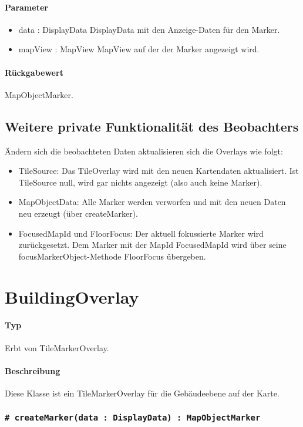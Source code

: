 \paragraph*{Parameter}
\begin{itemize}
    \item data : DisplayData DisplayData mit den Anzeige-Daten für den Marker.
    \item mapView : MapView MapView auf der der Marker angezeigt wird.
\end{itemize}
\paragraph*{Rückgabewert}
MapObjectMarker.


\subsection{Weitere private Funktionalität des Beobachters}
Ändern sich die beobachteten Daten aktualisieren sich die Overlays wie folgt:
\begin{itemize}
    \item TileSource: Das TileOverlay wird mit den neuen Kartendaten aktualisiert.
    Ist TileSource null, wird gar nichts angezeigt (also auch keine Marker).
    \item MapObjectData: Alle Marker werden verworfen und mit den neuen Daten neu erzeugt (über createMarker).
    \item FocusedMapId und FloorFocus: Der aktuell fokussierte Marker wird zurückgesetzt.
    Dem Marker mit der MapId FocusedMapId wird über seine focusMarkerObject-Methode FloorFocus übergeben.
\end{itemize}

\section{BuildingOverlay}
\paragraph*{Typ}
Erbt von TileMarkerOverlay.
\paragraph*{Beschreibung}
Diese Klasse ist ein TileMarkerOverlay für die Gebäudeebene auf der Karte.

\subsubsection{\texttt{# createMarker(data : DisplayData) : MapObjectMarker}}%
